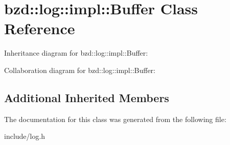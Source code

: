 \hypertarget{classbzd_1_1log_1_1impl_1_1Buffer}{}\section{bzd\+:\+:log\+:\+:impl\+:\+:Buffer Class Reference}
\label{classbzd_1_1log_1_1impl_1_1Buffer}


Inheritance diagram for bzd\+:\+:log\+:\+:impl\+:\+:Buffer\+:


Collaboration diagram for bzd\+:\+:log\+:\+:impl\+:\+:Buffer\+:
\subsection*{Additional Inherited Members}


The documentation for this class was generated from the following file\+:\begin{DoxyCompactItemize}
\item 
include/log.\+h\end{DoxyCompactItemize}
